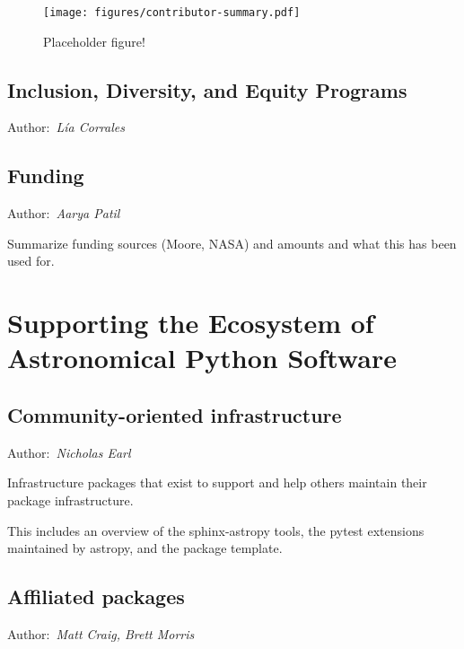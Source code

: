 \documentclass[modern]{aastex631}
\newcommand{\secauthor}[1]{{\color{blue}Author:~\textit{#1}}}
\begin{document}
\begin{figure}
    \begin{centering}
        \texttt{[image: figures/contributor-summary.pdf]}
        \caption{Placeholder figure!}
        \label{fig:contributor-summary}
    \end{centering}
\end{figure}


\subsection{Inclusion, Diversity, and Equity Programs} \label{sec:project-ide}

\secauthor{Lía Corrales}


\subsection{Funding} \label{sec:project-funding}

\secauthor{Aarya Patil}

Summarize funding sources (Moore, NASA) and amounts and what this has been used
for.


\section{Supporting the Ecosystem of Astronomical Python Software}
\label{sec:ecosystem}

\subsection{Community-oriented infrastructure}

\secauthor{Nicholas Earl}

Infrastructure packages that exist to support and help others maintain their
package infrastructure.

This includes an overview of the sphinx-astropy tools, the pytest extensions
maintained by astropy, and the package template.

\subsection{Affiliated packages}

\secauthor{Matt Craig, Brett Morris}
\end{document}
